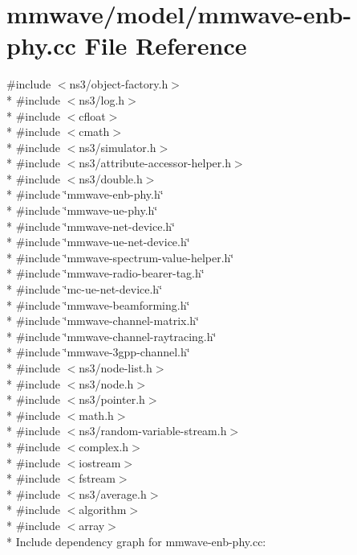 \hypertarget{mmwave-enb-phy_8cc}{}\section{mmwave/model/mmwave-\/enb-\/phy.cc File Reference}
\label{mmwave-enb-phy_8cc}
{\ttfamily \#include $<$ns3/object-\/factory.\+h$>$}\\*
{\ttfamily \#include $<$ns3/log.\+h$>$}\\*
{\ttfamily \#include $<$cfloat$>$}\\*
{\ttfamily \#include $<$cmath$>$}\\*
{\ttfamily \#include $<$ns3/simulator.\+h$>$}\\*
{\ttfamily \#include $<$ns3/attribute-\/accessor-\/helper.\+h$>$}\\*
{\ttfamily \#include $<$ns3/double.\+h$>$}\\*
{\ttfamily \#include \char`\"{}mmwave-\/enb-\/phy.\+h\char`\"{}}\\*
{\ttfamily \#include \char`\"{}mmwave-\/ue-\/phy.\+h\char`\"{}}\\*
{\ttfamily \#include \char`\"{}mmwave-\/net-\/device.\+h\char`\"{}}\\*
{\ttfamily \#include \char`\"{}mmwave-\/ue-\/net-\/device.\+h\char`\"{}}\\*
{\ttfamily \#include \char`\"{}mmwave-\/spectrum-\/value-\/helper.\+h\char`\"{}}\\*
{\ttfamily \#include \char`\"{}mmwave-\/radio-\/bearer-\/tag.\+h\char`\"{}}\\*
{\ttfamily \#include \char`\"{}mc-\/ue-\/net-\/device.\+h\char`\"{}}\\*
{\ttfamily \#include \char`\"{}mmwave-\/beamforming.\+h\char`\"{}}\\*
{\ttfamily \#include \char`\"{}mmwave-\/channel-\/matrix.\+h\char`\"{}}\\*
{\ttfamily \#include \char`\"{}mmwave-\/channel-\/raytracing.\+h\char`\"{}}\\*
{\ttfamily \#include \char`\"{}mmwave-\/3gpp-\/channel.\+h\char`\"{}}\\*
{\ttfamily \#include $<$ns3/node-\/list.\+h$>$}\\*
{\ttfamily \#include $<$ns3/node.\+h$>$}\\*
{\ttfamily \#include $<$ns3/pointer.\+h$>$}\\*
{\ttfamily \#include $<$math.\+h$>$}\\*
{\ttfamily \#include $<$ns3/random-\/variable-\/stream.\+h$>$}\\*
{\ttfamily \#include $<$complex.\+h$>$}\\*
{\ttfamily \#include $<$iostream$>$}\\*
{\ttfamily \#include $<$fstream$>$}\\*
{\ttfamily \#include $<$ns3/average.\+h$>$}\\*
{\ttfamily \#include $<$algorithm$>$}\\*
{\ttfamily \#include $<$array$>$}\\*
Include dependency graph for mmwave-\/enb-\/phy.cc\+:
